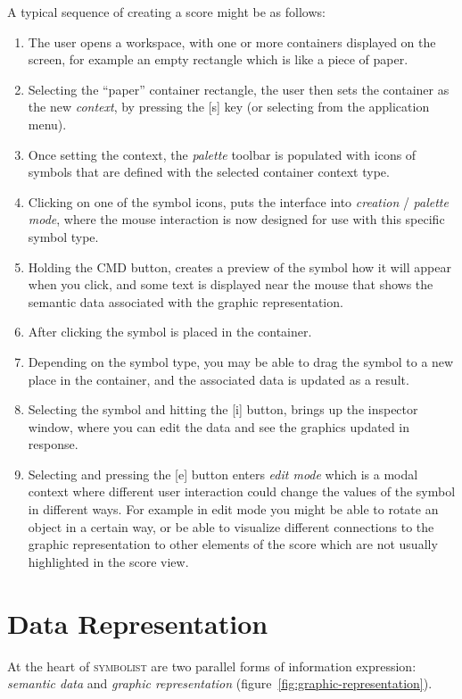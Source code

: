 \documentclass{article}
\def\symbolist{\textsc{symbolist}\xspace}
\begin{document}
A typical sequence of creating a score might be as follows:
\begin{enumerate}\itemsep0pt
\item The user opens a workspace, with one or more containers displayed on the screen, for example an empty rectangle which is like a piece of paper.
\item Selecting the ``paper'' container rectangle, the user then sets the container as the new \textit{context}, by pressing the [s] key (or selecting from the application menu).
\item Once setting the context, the \textit{palette} toolbar is populated with icons of symbols that are defined with the selected container context type.
\item Clicking on one of the symbol icons, puts the interface into \textit{creation} / \textit{palette mode}, where the mouse interaction is now designed for use with this specific symbol type.
\item Holding the CMD button, creates a preview of the symbol how it will appear when you click, and some text is displayed near the mouse that shows the semantic data associated with the graphic representation.
\item After clicking the symbol is placed in the container.
\item Depending on the symbol type, you may be able to drag the symbol to a new place in the container, and the associated data is updated as a result.
\item Selecting the symbol and hitting the [i] button, brings up the inspector window, where you can edit the data and see the graphics updated in response.
\item Selecting and pressing the [e] button enters \textit{edit mode} which is a modal context where different user interaction could change the values of the symbol in different ways. For example in edit mode you might be able to rotate an object in a certain way, or be able to visualize different connections to the graphic representation to other elements of the score which are not usually highlighted in the score view.
\end{enumerate}




\section{Data Representation}\label{subsec:representation}

At the heart of \symbolist are two parallel forms of information expression: \textit{semantic data} and \textit{graphic representation} (figure~\ref{fig:graphic-representation}).
\end{document}
